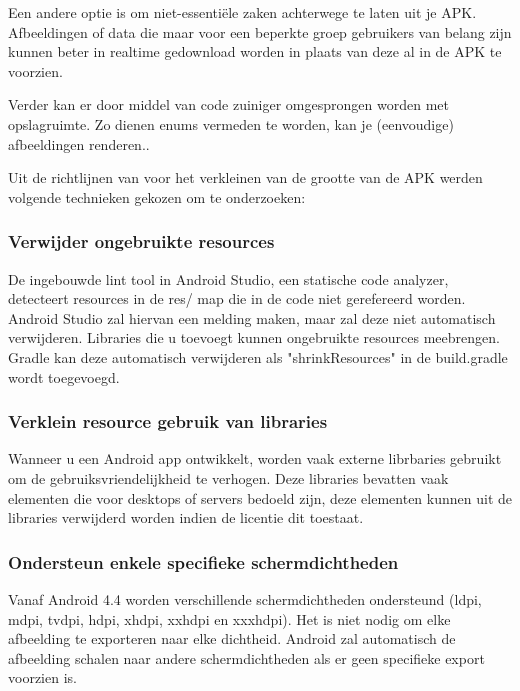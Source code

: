 Een andere optie is om niet-essentiële zaken achterwege te laten uit je APK. Afbeeldingen of data die maar voor een beperkte groep gebruikers van belang zijn kunnen beter in realtime gedownload worden in plaats van deze al in de APK te voorzien.

Verder kan er door middel van code zuiniger omgesprongen worden met opslagruimte. Zo dienen enums vermeden te worden, kan je (eenvoudige) afbeeldingen renderen..

Uit de richtlijnen van \cite{googlereduceapksize} voor het verkleinen van de grootte van de APK werden volgende technieken gekozen om te onderzoeken: 

\subsubsection{Verwijder ongebruikte resources}
\label{sec:removeunusedresources}
De ingebouwde lint tool in Android Studio, een statische code analyzer, detecteert resources in de res/ map die in de code niet gerefereerd worden. Android Studio zal hiervan een melding maken, maar zal deze niet automatisch verwijderen. Libraries die u toevoegt kunnen ongebruikte resources meebrengen. Gradle kan deze automatisch verwijderen als "shrinkResources" in de build.gradle wordt toegevoegd. 

\subsubsection{Verklein resource gebruik van libraries}
\label{sec:minimizeresourceslibraries}
Wanneer u een Android app ontwikkelt, worden vaak externe librbaries gebruikt om de gebruiksvriendelijkheid te verhogen. Deze libraries bevatten vaak elementen die voor desktops of servers bedoeld zijn, deze elementen kunnen uit de libraries verwijderd worden indien de licentie dit toestaat.

\subsubsection{Ondersteun enkele specifieke schermdichtheden }
\label{sec:supportspecificdensities}
Vanaf Android 4.4 worden verschillende schermdichtheden ondersteund (ldpi, mdpi, tvdpi, hdpi, xhdpi, xxhdpi en xxxhdpi). Het is niet nodig om elke afbeelding te exporteren naar elke dichtheid. Android zal automatisch de afbeelding schalen naar andere schermdichtheden als er geen specifieke export voorzien is. 

